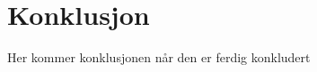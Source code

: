\cleardoublepage
\chapter{Konklusjon}
\label{chap:discussion} 
{\color{red} Her kommer konklusjonen når den er ferdig konkludert}
